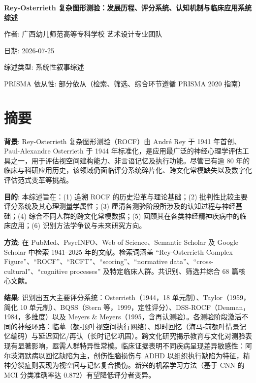 \documentclass[12pt,a4paper]{ctexart}
\begin{document}
\begin{titlepage}
\vspace*{3cm}
\begin{center}
{\huge\bfseries Rey-Osterrieth 复杂图形测验：发展历程、评分系统、认知机制与临床应用系统综述}

\vspace{2cm}

{\large 作者: 广西幼儿师范高等专科学校 艺术设计专业团队}

\vspace{0.5cm}

{\large 日期: 2026-07-25}

\vspace{0.5cm}

{\normalsize 综述类型: 系统性叙事综述}

{\normalsize PRISMA 依从性: 部分依从（检索、筛选、综合环节遵循 PRISMA 2020 指南）}
\end{center}
\end{titlepage}

\section*{摘要}

\textbf{背景}: Rey-Osterrieth 复杂图形测验（ROCF）由 André Rey 于 1941 年首创、Paul-Alexandre Osterrieth 于 1944 年标准化，是应用最广泛的神经心理学评估工具之一，用于评估视空间建构能力、非言语记忆及执行功能。尽管已有逾 80 年的临床与科研应用历史，该领域仍面临评分系统碎片化、跨文化常模缺失以及数字化评估范式变革等挑战。

\textbf{目的}: 本综述旨在：(1) 追溯 ROCF 的历史沿革与理论基础；(2) 批判性比较主要评分系统及其心理测量学属性；(3) 厘清各测验阶段所涉及的认知过程与神经基础；(4) 综合不同人群的跨文化常模数据；(5) 回顾其在各类神经精神疾病中的临床应用；(6) 识别方法学争议与未来研究方向。

\textbf{方法}: 在 PubMed、PsycINFO、Web of Science、Semantic Scholar 及 Google Scholar 中检索 1941–2025 年的文献。检索词涵盖 ``Rey-Osterrieth Complex Figure''、``ROCF''、``RCFT''、``scoring''、``normative data''、``cross-cultural''、``cognitive processes'' 及特定临床人群。共识别、筛选并综合 68 篇核心文献。

\textbf{结果}: 识别出五大主要评分系统：Osterrieth（1944，18 单元制）、Taylor（1959，简化 10 单元制）、BQSS（Stern 等，1999，定性评分）、DSS-ROCF（Denman，1984，多维度）以及 Meyers \& Meyers（1995，含再认测验）。各测验阶段激活不同的神经环路：临摹（额-顶叶视空间执行网络）、即时回忆（海马-前额叶情景记忆编码）与延迟回忆/再认（长时记忆巩固）。跨文化研究揭示教育与文化对测验表现有显著影响，亟需人群特异性常模。临床证据表明不同疾病呈现差异敏感性：阿尔茨海默病以回忆缺陷为主，创伤性脑损伤与 ADHD 以组织执行缺陷为特征，精神分裂症则表现为视空间与记忆复合损伤。新兴的机器学习方法（基于 CNN 的 MCI 分类准确率达 0.872）有望降低评分者变异。
\end{document}
